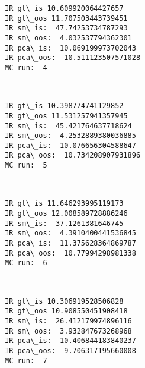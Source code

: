 \documentclass[11pt]{article}
\begin{document}
    \begin{Verbatim}[commandchars=\\\{\},fontsize=\footnotesize]
IR gt\_is 10.609920064427657
IR gt\_oos 11.707503443739451
IR sm\_is:  47.74253734787293
IR sm\_oos:  4.032537794362301
IR pca\_is:  10.069199973702043
IR pca\_oos:  10.511123507571028
MC run:  4

    \end{Verbatim}

    \begin{center}
    \end{center}
    { \hspace*{\fill} \\}
    
    \begin{Verbatim}[commandchars=\\\{\},fontsize=\footnotesize]
IR gt\_is 10.398774741129852
IR gt\_oos 11.531257941357945
IR sm\_is:  45.421764637718624
IR sm\_oos:  4.2532889380036885
IR pca\_is:  10.076656304588647
IR pca\_oos:  10.734208907931896
MC run:  5

    \end{Verbatim}

    \begin{center}
    \end{center}
    { \hspace*{\fill} \\}
    
    \begin{Verbatim}[commandchars=\\\{\},fontsize=\footnotesize]
IR gt\_is 11.646293995119173
IR gt\_oos 12.008589728886246
IR sm\_is:  37.1261381646745
IR sm\_oos:  4.3910400441536845
IR pca\_is:  11.375628364869787
IR pca\_oos:  10.77994298981338
MC run:  6

    \end{Verbatim}

    \begin{center}
    \end{center}
    { \hspace*{\fill} \\}
    
    \begin{Verbatim}[commandchars=\\\{\},fontsize=\footnotesize]
IR gt\_is 10.306919528506828
IR gt\_oos 10.908550451908418
IR sm\_is:  26.412179974896116
IR sm\_oos:  3.932847673268968
IR pca\_is:  10.406844183840237
IR pca\_oos:  9.706317195660008
MC run:  7

    \end{Verbatim}
\end{document}
